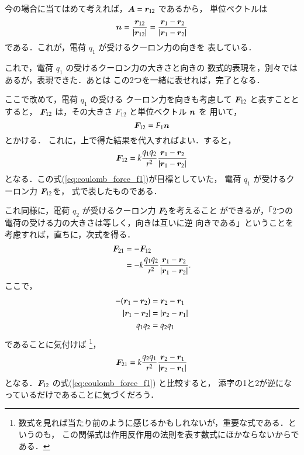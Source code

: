         今の場合に当てはめて考えれば，$\boldsymbol{A}=\boldsymbol{r}_{12}$ であるから，
        単位ベクトルは
            \begin{equation*}
                \boldsymbol{n} = \frac{\boldsymbol{r}_{12}}{|\boldsymbol{r}_{12}|}
                    = \frac{\boldsymbol{r}_{1} - \boldsymbol{r}_{2}}{|\boldsymbol{r}_{1} - \boldsymbol{r}_{2}|}
            \end{equation*}
        である．これが，電荷 $q_{1}$ が受けるクーロン力の向きを
        表している．

        これで，電荷 $q_{1}$ の受けるクーロン力の大きさと向きの
        数式的表現を，別々ではあるが，表現できた．あとは
        この2つを一緒に表せれば，完了となる．

        ここで改めて，電荷 $q_{1}$ の受ける
        クーロン力を向きも考慮して $\boldsymbol{F}_{12}$ と表すこととすると，
        $\boldsymbol{F}_{12}$ は，その大きさ $F_{12}$ と単位ベクトル $\boldsymbol{n}$ を
        用いて，
            \begin{equation*}
                \boldsymbol{F}_{12} = F_{1}\boldsymbol{n}
            \end{equation*}
        とかける．
        これに，上で得た結果を代入すればよい．すると，
            \begin{align}\label{eq:coulomb_force_f1}
                \bF_{12} = k \frac{q_{1}q_{2}}{r^{2}} \frac{\br_{1} - \br_{2}}{|\br_{1} - \br_{2}|}
            \end{align}
        となる．この式(\ref{eq:coulomb_force_f1})が目標としていた，
        電荷 $q_{1}$ が受けるクーロン力 $\boldsymbol{F}_{12}$を，
        式で表したものである．

        これ同様に，電荷 $q_{2}$ が受けるクーロン力 $\boldsymbol{F}_{2}$を考えること
        ができるが，「2つの電荷の受ける力の大きさは等しく，向きは互いに逆
        向きである」ということを考慮すれば，直ちに，次式を得る．
            \begin{align*}
                \boldsymbol{F}_{21} &= - \boldsymbol{F}_{12} \\
                        &= - k \frac{q_{1}q_{2}}{r^{2}} \frac{\boldsymbol{r}_{1} - \boldsymbol{r}_{2}}{|\boldsymbol{r}_{1} - \boldsymbol{r}_{2}|}.
            \end{align*}
        ここで，
            \begin{align*}
                -(\boldsymbol{r}_{1} - \boldsymbol{r}_{2}) &= \boldsymbol{r}_{2} - \boldsymbol{r}_{1} \\
                |\boldsymbol{r}_{1} - \boldsymbol{r}_{2}|  &= |\boldsymbol{r}_{2} - \boldsymbol{r}_{1}| \\
                q_{1}q_{2}           &= q_{2}q_{1}
            \end{align*}
        であることに気付けば
            \footnote{
                数式を見れば当たり前のように感じるかもしれないが，重要な式である．というのも，
                この関係式は作用反作用の法則を表す数式にほかならないからである．
            }，
            \begin{align}\label{eq:coulomb_force_f2}
                \bF_{21} = k \frac{q_{2}q_{1}}{r^{2}} \frac{\br_{2} - \br_{1}}{|\br_{2} - \br_{1}|}
            \end{align}
        となる．$\boldsymbol{F}_{12}$ の式(\ref{eq:coulomb_force_f1}) と比較すると，
        添字の1と2が逆になっているだけであることに気づくだろう．

